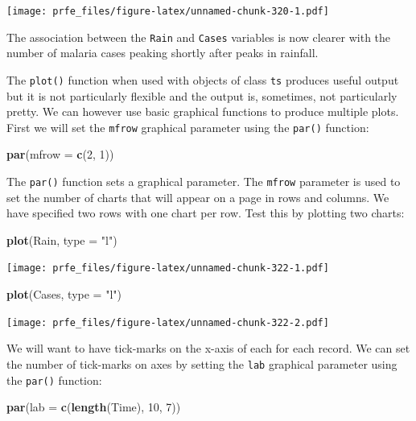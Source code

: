 \documentclass[12pt,a4paper]{book}
\newenvironment{Shaded}{\begin{snugshade}}{\end{snugshade}}
\newcommand{\KeywordTok}[1]{\textcolor[rgb]{0.13,0.29,0.53}{\textbf{#1}}}
\newcommand{\DataTypeTok}[1]{\textcolor[rgb]{0.13,0.29,0.53}{#1}}
\newcommand{\DecValTok}[1]{\textcolor[rgb]{0.00,0.00,0.81}{#1}}
\newcommand{\StringTok}[1]{\textcolor[rgb]{0.31,0.60,0.02}{#1}}
\newcommand{\NormalTok}[1]{#1}
\theoremstyle{definition}
\theoremstyle{definition}
\theoremstyle{definition}
\theoremstyle{remark}
\begin{document}
\texttt{[image: prfe\_files/figure-latex/unnamed-chunk-320-1.pdf]}

The association between the \texttt{Rain} and \texttt{Cases} variables
is now clearer with the number of malaria cases peaking shortly after
peaks in rainfall.

The \texttt{plot()} function when used with objects of class \texttt{ts}
produces useful output but it is not particularly flexible and the
output is, sometimes, not particularly pretty. We can however use basic
graphical functions to produce multiple plots. First we will set the
\texttt{mfrow} graphical parameter using the \texttt{par()} function:

\begin{Shaded}
\begin{Highlighting}[]
\KeywordTok{par}\NormalTok{(}\DataTypeTok{mfrow =} \KeywordTok{c}\NormalTok{(}\DecValTok{2}\NormalTok{, }\DecValTok{1}\NormalTok{))}
\end{Highlighting}
\end{Shaded}

The \texttt{par()} function sets a graphical parameter. The
\texttt{mfrow} parameter is used to set the number of charts that will
appear on a page in rows and columns. We have specified two rows with
one chart per row. Test this by plotting two charts:

\begin{Shaded}
\begin{Highlighting}[]
\KeywordTok{plot}\NormalTok{(Rain, }\DataTypeTok{type =} \StringTok{"l"}\NormalTok{)}
\end{Highlighting}
\end{Shaded}

\texttt{[image: prfe\_files/figure-latex/unnamed-chunk-322-1.pdf]}

\begin{Shaded}
\begin{Highlighting}[]
\KeywordTok{plot}\NormalTok{(Cases, }\DataTypeTok{type =} \StringTok{"l"}\NormalTok{)}
\end{Highlighting}
\end{Shaded}

\texttt{[image: prfe\_files/figure-latex/unnamed-chunk-322-2.pdf]}

We will want to have tick-marks on the x-axis of each for each record.
We can set the number of tick-marks on axes by setting the \texttt{lab}
graphical parameter using the \texttt{par()} function:

\begin{Shaded}
\begin{Highlighting}[]
\KeywordTok{par}\NormalTok{(}\DataTypeTok{lab =} \KeywordTok{c}\NormalTok{(}\KeywordTok{length}\NormalTok{(Time), }\DecValTok{10}\NormalTok{, }\DecValTok{7}\NormalTok{))}
\end{Highlighting}
\end{Shaded}
\end{document}
